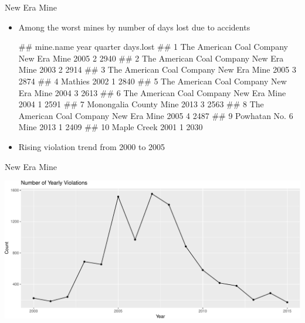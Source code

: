 \documentclass[]{beamer}
\providecommand{\tightlist}{%
  \setlength{\itemsep}{0pt}\setlength{\parskip}{0pt}}
\let\oldverbatim\verbatim
\let\endoldverbatim\endverbatim
\renewenvironment{verbatim}{\footnotesize\oldverbatim}{\endoldverbatim}
\begin{document}
\begin{frame}[fragile]{New Era Mine}

\begin{itemize}[<+->]
\tightlist
\item
  Among the worst mines by number of days lost due to accidents

\begin{verbatim}
##                                 mine.name year quarter days.lost
## 1  The American Coal Company New Era Mine 2005       2      2940
## 2  The American Coal Company New Era Mine 2003       2      2914
## 3  The American Coal Company New Era Mine 2005       3      2874
## 4                                 Mathies 2002       1      2840
## 5  The American Coal Company New Era Mine 2004       3      2613
## 6  The American Coal Company New Era Mine 2004       1      2591
## 7                  Monongalia County Mine 2013       3      2563
## 8  The American Coal Company New Era Mine 2005       4      2487
## 9                     Powhatan No. 6 Mine 2013       1      2409
## 10                            Maple Creek 2001       1      2030
\end{verbatim}


\item
  Rising violation trend from 2000 to 2005
\end{itemize}

\end{frame}

\begin{frame}{New Era Mine}

\begin{center}\includegraphics{presentation_slides_files/figure-beamer/new era viol-1} \end{center}

\end{frame}
\end{document}
